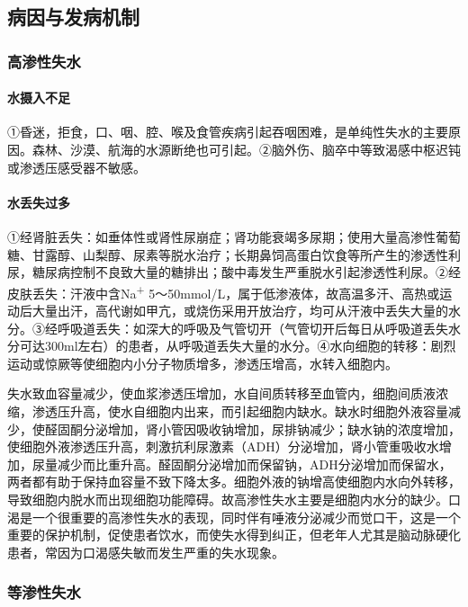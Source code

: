 \subsection{病因与发病机制}

\subsubsection{高渗性失水}

\paragraph{水摄入不足}

①昏迷，拒食，口、咽、腔、喉及食管疾病引起吞咽困难，是单纯性失水的主要原因。森林、沙漠、航海的水源断绝也可引起。②脑外伤、脑卒中等致渴感中枢迟钝或渗透压感受器不敏感。

\paragraph{水丢失过多}

①经肾脏丢失：如垂体性或肾性尿崩症；肾功能衰竭多尿期；使用大量高渗性葡萄糖、甘露醇、山梨醇、尿素等脱水治疗；长期鼻饲高蛋白饮食等所产生的渗透性利尿，糖尿病控制不良致大量的糖排出；酸中毒发生严重脱水引起渗透性利尿。②经皮肤丢失：汗液中含Na\textsuperscript{+}
5～50mmol/L，属于低渗液体，故高温多汗、高热或运动后大量出汗，高代谢如甲亢，或烧伤采用开放治疗，均可从汗液中丢失大量的水分。③经呼吸道丢失：如深大的呼吸及气管切开（气管切开后每日从呼吸道丢失水分可达300ml左右）的患者，从呼吸道丢失大量的水分。④水向细胞的转移：剧烈运动或惊厥等使细胞内小分子物质增多，渗透压增高，水转入细胞内。

失水致血容量减少，使血浆渗透压增加，水自间质转移至血管内，细胞间质液浓缩，渗透压升高，使水自细胞内出来，而引起细胞内缺水。缺水时细胞外液容量减少，使醛固酮分泌增加，肾小管因吸收钠增加，尿排钠减少；缺水钠的浓度增加，使细胞外液渗透压升高，刺激抗利尿激素（ADH）分泌增加，肾小管重吸收水增加，尿量减少而比重升高。醛固酮分泌增加而保留钠，ADH分泌增加而保留水，两者都有助于保持血容量不致下降太多。细胞外液的钠增高使细胞内水向外转移，导致细胞内脱水而出现细胞功能障碍。故高渗性失水主要是细胞内水分的缺少。口渴是一个很重要的高渗性失水的表现，同时伴有唾液分泌减少而觉口干，这是一个重要的保护机制，促使患者饮水，而使失水得到纠正，但老年人尤其是脑动脉硬化患者，常因为口渴感失敏而发生严重的失水现象。

\subsubsection{等渗性失水}

